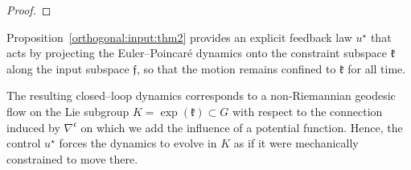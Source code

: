\documentclass[letterpaper, 10 pt, conference]{ieeeconf}
\begin{document}
\begin{proof}
\end{proof}


Proposition~\ref{orthogonal:input:thm2} provides an explicit feedback law $u^\star$ that acts by projecting the Euler--Poincaré dynamics 
onto the constraint subspace $\mathfrak{k}$ along the input subspace $\mathfrak{f}$, 
so that the motion remains confined to $\mathfrak{k}$ for all time. 

The resulting closed--loop dynamics corresponds to a non-Riemannian geodesic flow on the Lie subgroup $K=\exp(\mathfrak{k})\subset G$ 
with respect to the connection induced by $\nabla^{\mathfrak{c}}$ on which we add the influence of a potential function. Hence, the control $u^\star$ forces the dynamics to evolve in $K$ as if it were 
mechanically constrained to move there. 
\end{document}
